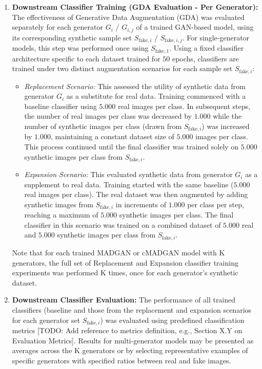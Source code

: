 \begin{enumerate}
    \item \textbf{Downstream Classifier Training (GDA Evaluation - Per Generator):} The effectiveness of Generative Data Augmentation (GDA) was evaluated separately for each generator \(G_i\) / \(G_{i, j}\) of a trained GAN-based model, using its corresponding synthetic sample set \(S_{\text{fake}, i}\) / \(S_{\text{fake}, i, j}\). For single-generator models, this step was performed once using \(S_{\text{fake}, 1}\). Using a fixed classifier architecture specific to each dataset trained for $50$ epochs, classifiers are trained under two distinct augmentation scenarios for each sample set \(S_{\text{fake}, i}\):
        \begin{itemize} \label{exp_setup_difference_replace_expand}
            \item \textit{Replacement Scenario:} This assessed the utility of synthetic data from generator \(G_i\) as a substitute for real data. Training commenced with a baseline classifier using $5.000$ real images per class. In subsequent steps, the number of real images per class was decreased by $1.000$ while the number of synthetic images per class (drawn from \(S_{\text{fake}, i}\)) was increased by $1.000$, maintaining a constant dataset size of $5.000$ images per class. This process continued until the final classifier was trained solely on $5.000$ synthetic images per class from \(S_{\text{fake}, i}\).
            \item \textit{Expansion Scenario:} This evaluated synthetic data from generator \(G_i\) as a supplement to real data. Training started with the same baseline ($5.000$ real images per class). The real dataset was then augmented by adding synthetic images from \(S_{\text{fake}, i}\) in increments of $1.000$ per class per step, reaching a maximum of $5.000$ synthetic images per class. The final classifier in this scenario was trained on a combined dataset of $5.000$ real and $5.000$ synthetic images per class from \(S_{\text{fake}, i}\).
        \end{itemize}
      Note that for each trained MADGAN or cMADGAN model with K generators, the full set of Replacement and Expansion classifier training experiments was performed K times, once for each generator's synthetic dataset.

    \item \textbf{Downstream Classifier Evaluation:} The performance of all trained classifiers (baseline and those from the replacement and expansion scenarios for each generator set \(S_{\text{fake}, i}\)) was evaluated using predefined classification metrics [TODO: Add reference to metrics definition, e.g., Section X.Y on Evaluation Metrics]. Results for multi-generator models may be presented as averages across the K generators or by selecting representative examples of specific generators with specified ratios between real and fake images.
\end{enumerate}

